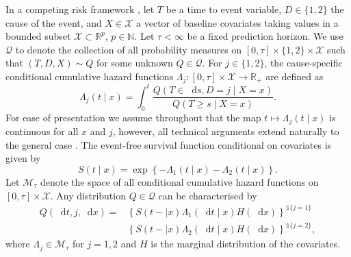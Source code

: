 \documentclass[a4paper,danish]{article}
\theoremstyle{plain} %
\numberwithin{theorem}{section}
\theoremstyle{definition} %
\theoremstyle{remark}
\newcommand{\R}{\mathbb{R}}
\newcommand{\N}{\mathbb{N}}
\newcommand*\diff{\mathop{}\!\mathrm{d}}
\newcommand{\1}{\mathds{1}}
\begin{document}
In a competing risk framework \citep{andersen2012statistical}, let \(
T\) be a time to event variable, \(D\in\{1,2\}\) the cause of the
event, and $X \in \mathcal{X}$ a vector of baseline covariates taking
values in a bounded subset \( \mathcal{X} \subset \R^p \), \( p\in\N
\). Let $\tau< \infty$ be a fixed prediction horizon. We use \(
\mathcal{Q} \) to denote the collection of all probability measures on
\( [0,\tau] \times \{1,2\}\times \mathcal{X} \) such that \( (T, D, X)
\sim Q \) for some unknown \( Q \in \mathcal{Q} \). For
\(j\in\{1,2\}\), the cause-specific conditional cumulative hazard
functions \( \Lambda_{j} \colon [0, \tau] \times \mathcal{X}
\rightarrow \R_+ \) are defined as
\begin{equation*}
  \Lambda_{j}(t \mid x) = \int_0^t\frac{  Q(T \in \diff s, D=j \mid X=x )}{Q(T \geq s \mid X=x )}.
\end{equation*} For ease of presentation we assume throughout that the
map \( t\mapsto \Lambda_j(t \mid x) \) is continuous for all \( x \)
and \( j \), however, 
all technical arguments extend naturally to the general case \citep{andersen2012statistical}.
The event-free survival function conditional on covariates is given by
\begin{equation}
  \label{eq:surv-def}
  S(t \mid x)=\exp\left\{-\Lambda_{1}(t \mid x)-\Lambda_{2}(t \mid x)\right\}.
\end{equation}
Let \( \mathcal{M}_{\tau}\) denote the space of all conditional cumulative hazard
functions on \( [0,\tau] \times\mathcal{X}\). Any distribution
\( Q \in \mathcal{Q} \) can be characterised by
\begin{equation*}
  \label{eq:parametrizeQ}
  \begin{split}
    Q(\diff t,j,\diff x)=& \left\{S(t- \mid x)\Lambda_1(\diff t \mid x)H(\diff x)\right\}^{\1{\{j=1\}}}\\
                         &  \left\{S(t- \mid x)\Lambda_2(\diff t \mid x)H(\diff x)\right\}^{\1{\{j=2\}}},
  \end{split}
\end{equation*}
where \(\Lambda_{j} \in \mathcal{M}_{\tau}\) for \(j=1,2\) and \(H\) is the marginal
distribution of the covariates.
\end{document}
